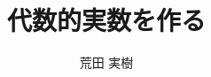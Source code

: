 \documentclass[dvipdfmx,report]{jsbook}
\title{代数的実数を作る}
\author{荒田 実樹}
\begin{document}
\maketitle
\tableofcontents
\setcounter{chapter}{-1}
{\newcommand\currenttitle{イントロダクション}}
{\newcommand\currenttitle{一変数多項式環}}
{\newcommand\currenttitle{実根の数え上げ}}
{\newcommand\currenttitle{代数的数の演算}}
\end{document}
